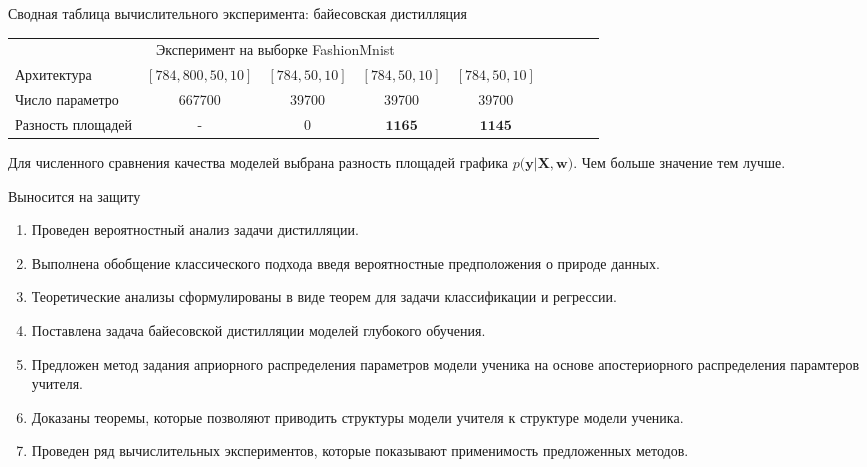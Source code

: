 \documentclass[10pt,pdf,hyperref={unicode}]{beamer}
\begin{document}
\begin{frame}{Сводная таблица вычислительного эксперимента: байесовская дистилляция}
\begin{table}[]
\begin{center}
{\begin{tabular}{|l|c|c|c|c|llll}
\multicolumn{5}{|c|}{Эксперимент на выборке FashionMnist}                                                     &                      &                      &                      &                      \\ \cline{1-5}
Архитектура           & $[784,800,50,10]$& $[784,50,10]$   & $[784,50,10]$  & $[784,50,10]$      &                      &                      &                      &                      \\ \cline{1-5}
Число параметро    &   667700                     &     39700                     &      39700                   &      39700                       &                      &                      &                      &                      \\ \cline{1-5}
Разность площадей   & -                           & 0                       &  $\mathbf{1165}$               & $\mathbf{1145} $                   &                      &                      &                      &                      \\ \cline{1-5}
\end{tabular}
}
\end{center}
\end{table}

Для численного сравнения качества моделей выбрана разность площадей графика $p\bigr(\mathbf{y}|\mathbf{X}, \mathbf{w}\bigr)$. Чем больше значение тем лучше.

\end{frame}

\begin{frame}{Выносится на защиту}
\justifying
	\begin{enumerate}
	\justifying
		\item Проведен вероятностный анализ задачи дистилляции.
		\item Выполнена обобщение классического подхода введя вероятностные предположения о природе данных.
		\item Теоретические анализы сформулированы в виде теорем для задачи классификации и регрессии.
		\item Поставлена задача байесовской дистилляции моделей глубокого обучения.
		\item Предложен метод задания априорного распределения параметров модели ученика на основе апостериорного распределения парамтеров учителя.
		\item Доказаны теоремы, которые позволяют приводить структуры модели учителя к структуре модели ученика.
		\item Проведен ряд вычислительных экспериментов, которые показывают применимость предложенных методов.
	\end{enumerate}

\end{frame}
\end{document}
